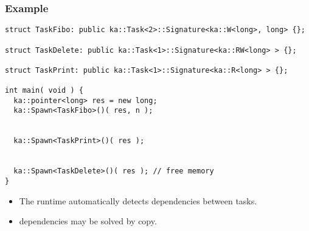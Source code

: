 \begin{frame}[fragile]
  \frametitle{Example}
\begin{block}{}
\begin{lstlisting}[basicstyle=\scriptsize\ttfamily]
struct TaskFibo: public ka::Task<2>::Signature<ka::W<long>, long> {};

struct TaskDelete: public ka::Task<1>::Signature<ka::RW<long> > {};

struct TaskPrint: public ka::Task<1>::Signature<ka::R<long> > {};

int main( void ) {
  ka::pointer<long> res = new long;
  ka::Spawn<TaskFibo>()( res, n );


  ka::Spawn<TaskPrint>()( res );


  ka::Spawn<TaskDelete>()( res ); // free memory 
}
\end{lstlisting}
\end{block}
%
\begin{itemize}
\item The runtime automatically detects dependencies between tasks.
\item {} dependencies may be solved by copy.
\end{itemize}
%
\end{frame}
